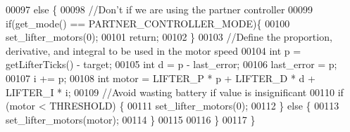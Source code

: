 \begin{DoxyCode}
00097   \textcolor{keywordflow}{else} \{
00098     \textcolor{comment}{//Don't if we are using the partner controller}
00099     \textcolor{keywordflow}{if}(get_mode() == PARTNER_CONTROLLER_MODE)\{
00100       set_lifter_motors(0);
00101       \textcolor{keywordflow}{return};
00102     \}
00103     \textcolor{comment}{//Define the proportion, derivative, and integral to be used in the motor speed}
00104     \textcolor{keywordtype}{int} p = getLifterTicks() - target;
00105     \textcolor{keywordtype}{int} d = p - last\_error;
00106     last\_error = p;
00107     i += p;
00108     \textcolor{keywordtype}{int} motor = LIFTER_P * p + LIFTER_D * d + LIFTER_I * i;
00109     \textcolor{comment}{//Avoid wasting battery if value is insignificant}
00110     \textcolor{keywordflow}{if} (motor < THRESHOLD) \{
00111         set_lifter_motors(0);
00112     \} \textcolor{keywordflow}{else} \{
00113         set_lifter_motors(motor);
00114     \}
00115 
00116   \}
00117 \}
\end{DoxyCode}
